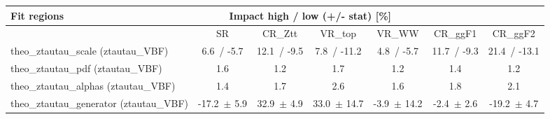\begin{tabular}{ l || c  c  c  c  c  c }
Fit regions & \multicolumn{4}{||c}{Impact high / low (+/- stat) [\%]} &  & \tabularnewline
\hline
 & SR & CR\_Ztt & VR\_top & VR\_WW & CR\_ggF1 & CR\_ggF2 \tabularnewline
\hline
theo\_ztautau\_scale (ztautau\_VBF) & 6.6\, / -5.7 & 12.1\, / -9.5 & 7.8\, / -11.2 & 4.8\, / -5.7 & 11.7\, / -9.3 & 21.4\, / -13.1\tabularnewline
theo\_ztautau\_pdf (ztautau\_VBF) & 1.6 & 1.2 & 1.7 & 1.2 & 1.4 & 1.2\tabularnewline
theo\_ztautau\_alphas (ztautau\_VBF) & 1.4 & 1.7 & 2.6 & 1.6 & 1.8 & 2.1\tabularnewline
theo\_ztautau\_generator (ztautau\_VBF) & -17.2\, $\pm$  5.9 & 32.9\, $\pm$  4.9 & 33.0\, $\pm$  14.7 & -3.9\, $\pm$  14.2 & -2.4\, $\pm$  2.6 & -19.2\, $\pm$  4.7
\end{tabular}
